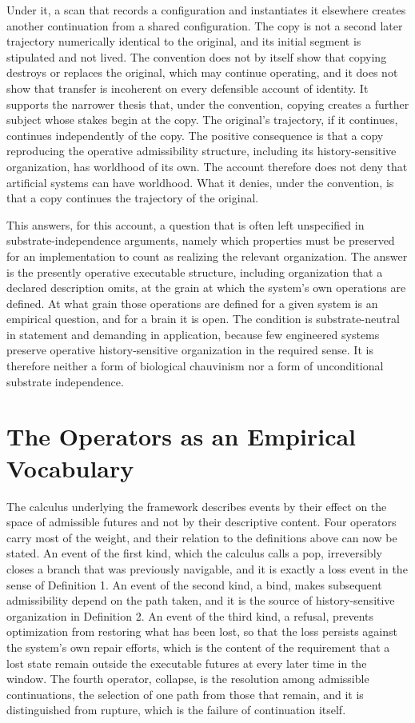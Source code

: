 \documentclass[11pt]{article}
\theoremstyle{definition}
\theoremstyle{plain}
\theoremstyle{remark}
\begin{document}
Under it, a scan that records a configuration and instantiates it elsewhere creates another continuation from a shared configuration. The copy is not a second later trajectory numerically identical to the original, and its initial segment is stipulated and not lived. The convention does not by itself show that copying destroys or replaces the original, which may continue operating, and it does not show that transfer is incoherent on every defensible account of identity. It supports the narrower thesis that, under the convention, copying creates a further subject whose stakes begin at the copy. The original's trajectory, if it continues, continues independently of the copy. The positive consequence is that a copy reproducing the operative admissibility structure, including its history-sensitive organization, has worldhood of its own. The account therefore does not deny that artificial systems can have worldhood. What it denies, under the convention, is that a copy continues the trajectory of the original.

This answers, for this account, a question that is often left unspecified in substrate-independence arguments, namely which properties must be preserved for an implementation to count as realizing the relevant organization. The answer is the presently operative executable structure, including organization that a declared description omits, at the grain at which the system's own operations are defined. At what grain those operations are defined for a given system is an empirical question, and for a brain it is open. The condition is substrate-neutral in statement and demanding in application, because few engineered systems preserve operative history-sensitive organization in the required sense. It is therefore neither a form of biological chauvinism nor a form of unconditional substrate independence.

\section{The Operators as an Empirical Vocabulary}

The calculus underlying the framework describes events by their effect on the space of admissible futures and not by their descriptive content. Four operators carry most of the weight, and their relation to the definitions above can now be stated. An event of the first kind, which the calculus calls a pop, irreversibly closes a branch that was previously navigable, and it is exactly a loss event in the sense of Definition 1. An event of the second kind, a bind, makes subsequent admissibility depend on the path taken, and it is the source of history-sensitive organization in Definition 2. An event of the third kind, a refusal, prevents optimization from restoring what has been lost, so that the loss persists against the system's own repair efforts, which is the content of the requirement that a lost state remain outside the executable futures at every later time in the window. The fourth operator, collapse, is the resolution among admissible continuations, the selection of one path from those that remain, and it is distinguished from rupture, which is the failure of continuation itself.
\end{document}
